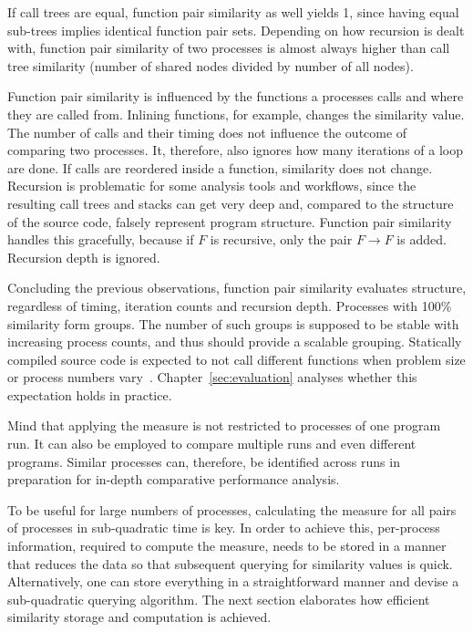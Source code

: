 \documentclass[a4paper, final, diplominf]{zih-template}
\begin{document}
If call trees are equal, function pair similarity as well yields 1, since having equal sub-trees implies identical function pair sets.
Depending on how recursion is dealt with, function pair similarity of two processes is almost always higher than call tree similarity (number of shared nodes divided by number of all nodes).
%
%

Function pair similarity is influenced by the functions a processes calls and where they are called from.
Inlining functions, for example, changes the similarity value.
The number of calls and their timing does not influence the outcome of comparing two processes.
It, therefore, also ignores how many iterations of a loop are done.
If calls are reordered inside a function, similarity does not change.
Recursion is problematic for some analysis tools and workflows, since the resulting call trees and stacks can get very deep and, compared to the structure of the source code, falsely represent program structure.
Function pair similarity handles this gracefully, because if $F$ is recursive, only the pair $F \rightarrow F$ is added.
Recursion depth is ignored.

Concluding the previous observations, function pair similarity evaluates structure, regardless of timing, iteration counts and recursion depth.
Processes with 100\% similarity form groups.
The number of such groups is supposed to be stable with increasing process counts, and thus should provide a scalable grouping.
Statically compiled source code is expected to not call different functions when problem size or process numbers vary~\cite{allineaddt, arnold07, johnson91}.
Chapter~\ref{sec:evaluation} analyses whether this expectation holds in practice.

Mind that applying the measure is not restricted to processes of one program run.
It can also be employed to compare multiple runs and even different programs.
Similar processes can, therefore, be identified across runs in preparation for in-depth comparative performance analysis.

To be useful for large numbers of processes, calculating the measure for all pairs of processes in sub-quadratic time is key.
In order to achieve this, per-process information, required to compute the measure, needs to be stored in a manner that reduces the data so that subsequent querying for similarity values is quick.
Alternatively, one can store everything in a straightforward manner and devise a sub-quadratic querying algorithm.
The next section elaborates how efficient similarity storage and computation is achieved.
\end{document}
